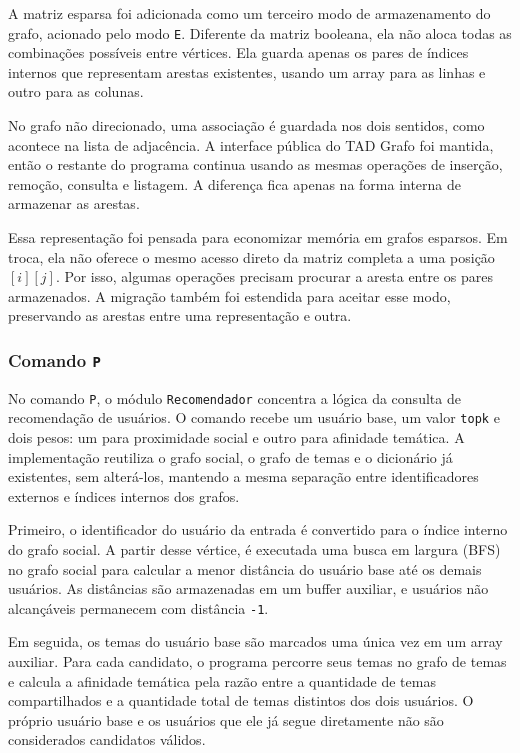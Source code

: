 \documentclass[12pt,a4paper]{article}
\begin{document}
A matriz esparsa foi adicionada como um terceiro modo de armazenamento do grafo,
acionado pelo modo \texttt{E}. Diferente da matriz booleana, ela não aloca todas as
combinações possíveis entre vértices. Ela guarda apenas os pares de índices internos
que representam arestas existentes, usando um array para as linhas e outro para as
colunas.

No grafo não direcionado, uma associação é guardada nos dois sentidos, como acontece
na lista de adjacência. A interface pública do TAD Grafo foi mantida, então o restante
do programa continua usando as mesmas operações de inserção, remoção, consulta e
listagem. A diferença fica apenas na forma interna de armazenar as arestas.

Essa representação foi pensada para economizar memória em grafos esparsos. Em troca,
ela não oferece o mesmo acesso direto da matriz completa a uma posição $[i][j]$. Por
isso, algumas operações precisam procurar a aresta entre os pares armazenados. A
migração também foi estendida para aceitar esse modo, preservando as arestas entre uma
representação e outra.

\subsubsection{Comando \texttt{P}}

No comando \texttt{P}, o módulo \texttt{Recomendador} concentra a lógica da
consulta de recomendação de usuários. O comando recebe um
usuário base, um valor \texttt{topk} e dois pesos: um para proximidade social e outro
para afinidade temática. A implementação reutiliza o grafo social, o grafo de temas e
o dicionário já existentes, sem alterá-los, mantendo a mesma separação entre identificadores externos
e índices internos dos grafos.

Primeiro, o identificador do usuário da entrada é convertido para o índice interno do grafo
social. A partir desse vértice, é executada uma busca em largura (BFS) no grafo social para
calcular a menor distância do usuário base até os demais usuários. As
distâncias são armazenadas em um buffer auxiliar, e usuários não alcançáveis permanecem
com distância \texttt{-1}.

Em seguida, os temas do usuário base são marcados uma única vez em um array auxiliar.
Para cada candidato, o programa percorre seus temas no grafo de temas e calcula a afinidade temática pela razão entre a quantidade de temas compartilhados
e a quantidade total de temas distintos dos dois usuários. O próprio
usuário base e os usuários que ele já segue diretamente não são considerados
candidatos válidos.
\end{document}
